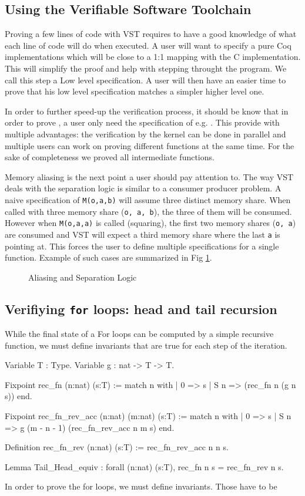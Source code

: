 \subsection{Using the Verifiable Software Toolchain}

Proving a few lines of code with VST requires to have a good knowledge of what
each line of code will do when executed. A user will want to specify a pure Coq
implementations which will be close to a 1:1 mapping with the C implementation.
This will simplify the proof and help with stepping throught the program.
We call this step a Low level specification. A user will then have an easier
time to prove that his low level specification matches a simpler higher level one.

In order to further speed-up the verification process, it should be know that
in order to prove , a user only need the specification
of e.g. . This provide with multiple advantages: the verification by the
kernel can be done in parallel and multiple users can work on proving different
functions at the same time. For the sake of completeness we proved all intermediate
functions.

Memory aliasing is the next point a user should pay attention to. The way VST
deals with the separation logic is similar to a consumer producer problem.
A naive specification of \texttt{M(o,a,b)} will assume three distinct memory share.
When called with three memory share (\texttt{o, a, b}), the three of them will be consumed.
However when \texttt{M(o,a,a)} is called (squaring), the first two memory shares (\texttt{o, a})
are consumed and VST will expect a third memory share where the last \texttt{a} is pointing at.
This forces the user to define multiple specifications for a single function.
Example of such cases are summarized in Fig \ref{tk:MemSame}.
\begin{figure}[h]
  
  \caption{Aliasing and Separation Logic}
  \label{tk:MemSame}
\end{figure}

\subsection{Verifiying \texttt{for} loops: head and tail recursion}

While the final state of a For loops can be computed by a simple recursive function,
we must define invariants that are true for each step of the iteration.

\begin{Coq}
Variable T : Type.
Variable g : nat -> T -> T.

Fixpoint rec_fn (n:nat) (s:T) :=
  match n with
  | 0 => s
  | S n => (rec_fn n (g n s))
  end.

Fixpoint rec_fn_rev_acc (n:nat) (m:nat) (s:T) :=
  match n with
  | 0 => s
  | S n => g (m - n - 1) (rec_fn_rev_acc n m s)
  end.

Definition rec_fn_rev (n:nat) (s:T) :=
  rec_fn_rev_acc n n s.

Lemma Tail_Head_equiv :
  forall (n:nat) (s:T),
  rec_fn n s = rec_fn_rev n s.
\end{Coq}

In order to prove the for loops, we must define invariants.
Those have to be



